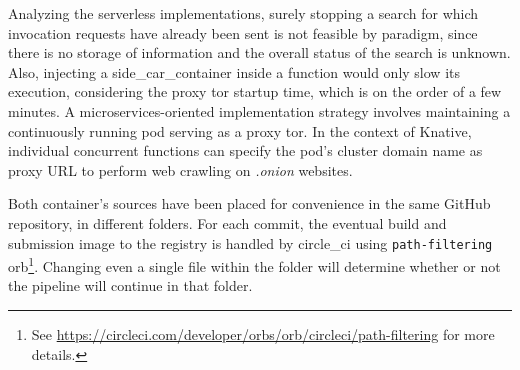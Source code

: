 \documentclass[../thesis.tex]{subfiles}
\begin{document}
Analyzing the serverless implementations, surely stopping a search for which invocation requests have already been sent is not feasible by paradigm, since there is no storage of information and the overall status of the search is unknown. Also, injecting a \gls{side_car_container} inside a function would only slow its execution, considering the proxy tor startup time, which is on the order of a few minutes. A microservices-oriented implementation strategy involves maintaining a continuously running \gls{pod} serving as a proxy tor. In the context of Knative, individual concurrent functions can specify the \gls{pod}'s cluster domain name as proxy \acrshort{URL} to perform web crawling on \textit{.onion} websites.

Both \gls{container}'s sources have been placed for convenience in the same GitHub repository, in different folders. For each commit, the eventual build and submission image to the registry is handled by \gls{circle_ci} using \texttt{path-filtering} orb\footnote{See \href{https://circleci.com/developer/orbs/orb/circleci/path-filtering}{https://circleci.com/developer/orbs/orb/circleci/path-filtering} for more details.}. Changing even a single file within the folder will determine whether or not the pipeline will continue in that folder.
\end{document}
